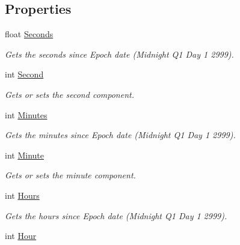 \subsection*{Properties}
\begin{DoxyCompactItemize}
\item 
float \hyperlink{struct_world_time_a25f5283141ffebd02172c733b86714d7}{Seconds}
\begin{DoxyCompactList}\small\item\em Gets the seconds since Epoch date (Midnight Q1 Day 1 2999). \end{DoxyCompactList}\item 
int \hyperlink{struct_world_time_a8a8b0a51575031bde059612c3ce77dfc}{Second}
\begin{DoxyCompactList}\small\item\em Gets or sets the second component. \end{DoxyCompactList}\item 
int \hyperlink{struct_world_time_abf67c1e98387182e7e776e8e86be0065}{Minutes}
\begin{DoxyCompactList}\small\item\em Gets the minutes since Epoch date (Midnight Q1 Day 1 2999). \end{DoxyCompactList}\item 
int \hyperlink{struct_world_time_ad318657e893a0beb7047b93a8984e574}{Minute}
\begin{DoxyCompactList}\small\item\em Gets or sets the minute component. \end{DoxyCompactList}\item 
int \hyperlink{struct_world_time_aa9214bdaacba28828afdc8cfb904fc9d}{Hours}
\begin{DoxyCompactList}\small\item\em Gets the hours since Epoch date (Midnight Q1 Day 1 2999). \end{DoxyCompactList}\item 
int \hyperlink{struct_world_time_a02d7b7493d1f177421c5fba0d81b9be8}{Hour}

\end{DoxyCompactItemize}
